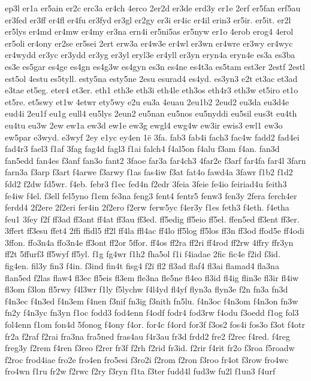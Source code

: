 {ep3l
er1a
er5ain
er2c
erc3a
er4ch
4erco
2er2d
er3de
erd3y
er1e
2erf
er5fan
erf5au
er3fed
er3ff
er4fl
er4fu
er3fyd
er3gl
er2gy
er3i
er4ic
er4il
erin3
er5ir.
er5it.
er2l
er5lys
er4md
er4mw
er4my
er3na
ern4i
er5ni5as
er5nyw
er1o
4erob
erog4
4erol
er5oli
er4ony
er2se
er5sei
2ert
erw3a
er4w3e
er4wl
er3wn
er4wre
er3wy
er4wyc
er4wydd
er3yc
er3ydd
er3yg
er3yl
eryl3e
er4yll
er3yn
eryn4a
eryn4e
es3a
es3ba
es3e
es5gar
es4ge
es4gn
es4g3w
es4gyn
es3n
es4ne
es4t3a
es5tam
est3er
2estf
2estl
est5ol
4estu
es5tyll.
esty5na
esty5ne
2esu
esurad4
es4yd.
es3yn3
e2t
et3ac
et3ad
e3tae
et5eg.
eter4
et3er.
eth1
eth3e
eth3i
eth4le
eth3os
eth4r3
eth3w
et5iro
et1o
et5re.
et5swy
et1w
4etwr
ety5wy
e2u
eu3a
4euau
2eu1b2
2eud2
eu3da
eu3d4e
eud4i
2eu1f
eu1g
eull4
eu5lys
2eun2
eu5nan
eu5nos
eu5nyddi
eu5sil
eus3t
eu4th
eu4tu
eu3w
2ew
ew1a
ew3d
ew1e
ew3g
ewgl4
ewg4w
ew3ir
ewis3
ewl1
ew3o
ew5par
e3wyd.
e3wyf
2ey
e1yc
ey4en
1ë
3fa.
fab3
fab4i
fach3
fac4w
fadd2
fad4ei
fad4r3
fael3
f1af
3fag
fag4d
fagl3
f1ai
falch4
f4al5on
f4alu
f3am
f4an.
fan3d
fan5edd
fan4es
f3anf
fan3o
fant2
3faoe
far3a
far4ch3
4far2e
f3arf
far4fa
far4l
3farn
farn3a
f3arp
f3art
f4arwe
f3arwy
f1as
fas4iw
f3at
fat4o
fawd4a
3fawr
f1b2
f1d2
fdd2
f2dw
fd5wr.
f4eb.
febr3
f1ec
fed4n
f2edr
3feia
3feie
fe4io
feiriad4u
feith3
fe4iw
f4el.
f3ell
fel5yno
f1em
fe3na
feng3
fent4
fentr5
fenw3
fen3y
2fera
ferch4er
ferdd4
2f2ere
2f2eri
fer4in
2f2ero
f2erw
ferw5yc
f4er3y
f1es
feth3
f4eth.
f4etha
feu1
3fey
f2f
ff3ad
ff3ant
ff4at
ff3au
ff3ed.
ff5edig
ff5eio
ff5el.
ffen5ed
ff3ent
ff3er.
3ffert
ff3esu
ffet4
2ffi
ffidl5
ff2l
ff4la
ffl4ac
ff4lo
ff5log
ff5los
ff3n
ff3od
ffod5e
ff4odi
3ffon.
ffo3n4a
ffo3n4e
ff3ont
ff2or
5ffor.
ff4os
ff2ra
ff2ri
ff4rod
ff2rw
4ffry
ffr3yn
ff2t
5ffurf3
ff5wyf
ff5yl.
f1g
fg4wr
f1h2
fha5ol
f1i
f4iadae
2fic
fic4e
f2id
f3id.
fig4en.
fil3y
fin3
f4in.
f3ind
fin4t
fisg4
f2ï
fl2
fl3ad
flaf4
fl3ai
flamad4
fla3na
flan5ed
f2las
flaw4
fl3ec
fl5eis
fl3em
fle3na
fle5ne
fl4eo
fl3id
fl4ig
flin3e
fl3ir
fl4iw
fl3om
f3lon
fl5rwy
f4l3wr
f1ly
f5lychw
f4l4yd
fl4yf
flyn3a
flyn3e
f2n
fn3a
fn3d
f4n3ec
f4n3ed
f4n3em
f4nen
f3nif
fn3ig
f3nith
fn5lu.
f4n3oc
f4n3om
f4n3on
fn3w
fn2y
f4n3yc
fn3yn
f1oc
fodd3
fod4enn
f4odf
fodr4
fod3rw
f4odu
f3oedd
f1og
fol3
fol4enn
f1om
fon4d
5fonog
f4ony
f4or.
for4c
f4ord
for3f
f3os2
fos4i
fos3o
f3ot
f4otr
fr2a
f2raf
f2rai
fra3na
fra5ned
fras4au
f4r3au
fr3d
frdd2
fre2
f2rec
f4red.
f4reg
freg3y
f2rem
f4ren
f3reo
f2rer
fr3f
f2rh
f2rid
fr3id.
f2rir
f4rit
fr2o
f3roa
f5roadw
f2roc
frod4iae
fro2e
fro4en
fro5esi
f3ro2i
f2rom
f2ron
f3roo
fr4ot
f3row
fro4wc
fro4wn
f1ru
fr2w
f2rwc
f2ry
f3ryn
f1ta
f3ter
fudd4l
fud3w
fu2l
f1un3
f4urf
}
